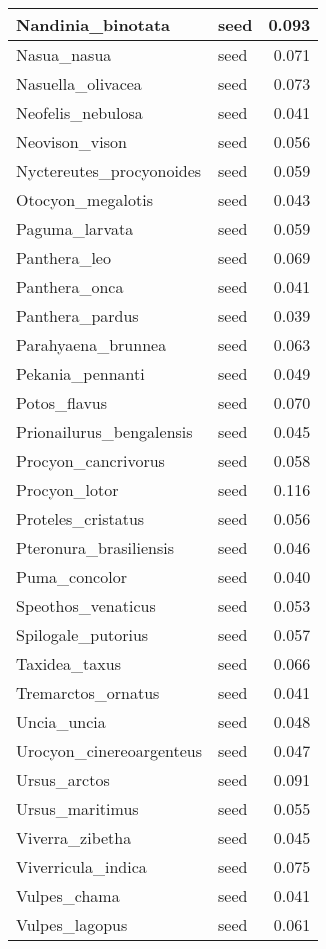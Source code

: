 \begin{table}
\begin{tabular}[t]{l|l|r}
\hline
Nandinia\_binotata & seed & 0.093\\
\hline
Nasua\_nasua & seed & 0.071\\
\hline
Nasuella\_olivacea & seed & 0.073\\
\hline
Neofelis\_nebulosa & seed & 0.041\\
\hline
Neovison\_vison & seed & 0.056\\
\hline
Nyctereutes\_procyonoides & seed & 0.059\\
\hline
Otocyon\_megalotis & seed & 0.043\\
\hline
Paguma\_larvata & seed & 0.059\\
\hline
Panthera\_leo & seed & 0.069\\
\hline
Panthera\_onca & seed & 0.041\\
\hline
Panthera\_pardus & seed & 0.039\\
\hline
Parahyaena\_brunnea & seed & 0.063\\
\hline
Pekania\_pennanti & seed & 0.049\\
\hline
Potos\_flavus & seed & 0.070\\
\hline
Prionailurus\_bengalensis & seed & 0.045\\
\hline
Procyon\_cancrivorus & seed & 0.058\\
\hline
Procyon\_lotor & seed & 0.116\\
\hline
Proteles\_cristatus & seed & 0.056\\
\hline
Pteronura\_brasiliensis & seed & 0.046\\
\hline
Puma\_concolor & seed & 0.040\\
\hline
Speothos\_venaticus & seed & 0.053\\
\hline
Spilogale\_putorius & seed & 0.057\\
\hline
Taxidea\_taxus & seed & 0.066\\
\hline
Tremarctos\_ornatus & seed & 0.041\\
\hline
Uncia\_uncia & seed & 0.048\\
\hline
Urocyon\_cinereoargenteus & seed & 0.047\\
\hline
Ursus\_arctos & seed & 0.091\\
\hline
Ursus\_maritimus & seed & 0.055\\
\hline
Viverra\_zibetha & seed & 0.045\\
\hline
Viverricula\_indica & seed & 0.075\\
\hline
Vulpes\_chama & seed & 0.041\\
\hline
Vulpes\_lagopus & seed & 0.061\\

\end{tabular}
\end{table}
